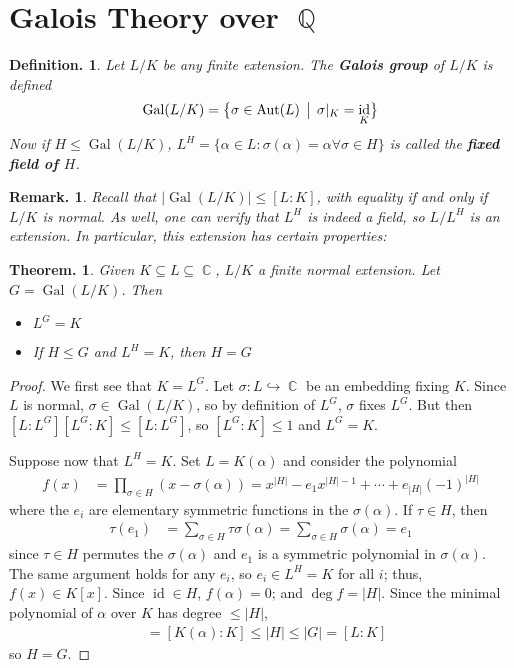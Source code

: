 \documentclass[11pt, a4paper]{memoir}
\DeclareMathOperator{\Q}{{\mathbb{Q}}}
\DeclareMathOperator{\C}{{\mathbb{C}}}
\newcommand{\hto}[0]{\ensuremath{\hookrightarrow}}
\theoremstyle{change}
\newtheorem{theorem}{Theorem.}[section]
\theoremstyle{plain}
\theoremstyle{nonumberplain}
\newtheorem{definition}{Definition.}
\newtheorem{remark}{Remark.}
\newtheorem{proof}{Proof}
\DeclareMathOperator{\Aut}{Aut}
\DeclareMathOperator{\Gal}{Gal}
\DeclareMathOperator{\id}{id}
\newcommand{\mbf}[1]{{\boldmath\bfseries #1}}
\numberwithin{equation}{section}
\begin{document}
\section{Galois Theory over \texorpdfstring{$\Q$}{Q}}
\begin{definition}
    Let $L/K$ be any finite extension.
    The \mbf{Galois group} of $L/K$ is defined
    \begin{equation*}
        \Gal(L/K)=\bigl\{\sigma\in\Aut(L)\,\bigm|\,\sigma|_K=\id_K\bigr\}
    \end{equation*}
    Now if $H\leq\Gal(L/K)$, $L^H=\{\alpha\in L:\sigma(\alpha)=\alpha\forall\sigma\in H\}$ is called the \mbf{fixed field of $H$}.
\end{definition}
\begin{remark}
    Recall that $|\Gal(L/K)|\leq[L:K]$, with equality if and only if $L/K$ is normal.
    As well, one can verify that $L^H$ is indeed a field, so $L/L^H$ is an extension.
    In particular, this extension has certain properties:
\end{remark}
\begin{theorem}\label{thm:galfix}
    Given $K\subseteq L\subseteq\C$, $L/K$ a finite normal extension.
    Let $G=\Gal(L/K)$.
    Then
    \begin{itemize}[nolistsep]
        \item $L^G=K$
        \item If $H\leq G$ and $L^H=K$, then $H=G$
    \end{itemize}
\end{theorem}
\begin{proof}
    We first see that $K=L^G$.
    Let $\sigma:L\hto\C$ be an embedding fixing $K$.
    Since $L$ is normal, $\sigma\in\Gal(L/K)$, so by definition of $L^G$, $\sigma$ fixes $L^G$.
    But then $[L:L^G][L^G:K]\leq[L:L^G]$, so $[L^G:K]\leq 1$ and $L^G=K$.

    Suppose now that $L^H=K$.
    Set $L=K(\alpha)$ and consider the polynomial
    \begin{align*}
        f(x) &= \prod_{\sigma\in H}(x-\sigma(\alpha))= x^{|H|}-e_1x^{|H|-1}+\cdots+e_{|H|}(-1)^{|H|}
    \end{align*}
    where the $e_i$ are elementary symmetric functions in the $\sigma(\alpha)$.
    If $\tau\in H$, then
    \begin{align*}
        \tau(e_1)&=\sum\limits_{\sigma\in H}\tau\sigma(\alpha)= \sum\limits_{\sigma\in H}\sigma(\alpha)=e_1
    \end{align*}
    since $\tau\in H$ permutes the $\sigma(\alpha)$ and $e_1$ is a symmetric polynomial in $\sigma(\alpha)$.
    The same argument holds for any $e_i$, so $e_i\in L^H=K$ for all $i$; thus, $f(x)\in K[x]$.
    Since $\id\in H$, $f(\alpha)=0$; and $\deg f=|H|$.
    Since the minimal polynomial of $\alpha$ over $K$ has degree $\leq|H|$,
    \begin{align*}
        [L:K] &= [K(\alpha):K]\leq|H|\leq|G|=[L:K]
    \end{align*}
    so $H=G$.
\end{proof}
\end{document}
